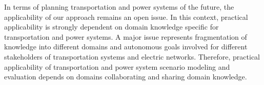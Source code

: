 In terms of planning transportation and power systems of the future, the applicability of our approach remains an open issue. In this context, practical applicability is strongly dependent on domain knowledge specific for transportation and power systems. A major issue represents fragmentation of knowledge into different domains and autonomous goals involved for different stakeholders of transportation systems and electric networks. Therefore, practical applicability of transportation and power system scenario modeling and evaluation depends on domains collaborating and sharing domain knowledge.